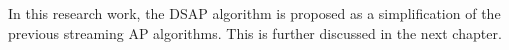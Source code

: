       

In this research work, the DSAP algorithm is proposed as a simplification of the previous streaming AP algorithms. This is further discussed in the next chapter.







